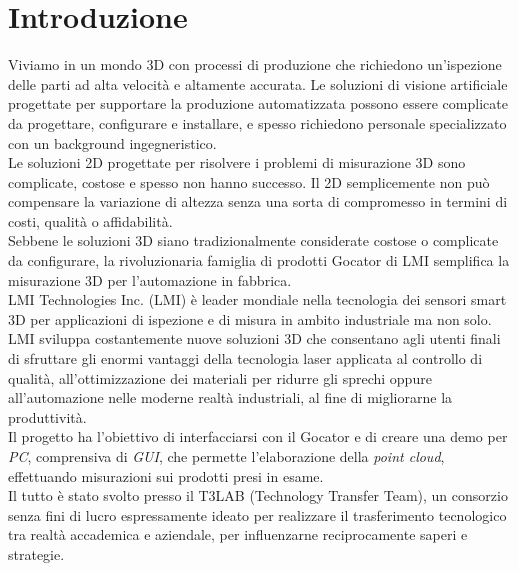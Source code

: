 \chapter{Introduzione}
\label{Cha:introduzione}
\thispagestyle{empty}

Viviamo in un mondo 3D con processi di produzione che richiedono un'ispezione delle parti ad alta velocità e altamente accurata. Le soluzioni di visione artificiale progettate per supportare la produzione automatizzata possono essere complicate da progettare, configurare e installare, e spesso richiedono personale specializzato con un background ingegneristico.\\
\newline
Le soluzioni 2D progettate per risolvere i problemi di misurazione 3D sono complicate, costose e spesso non hanno successo. Il 2D semplicemente non può compensare la variazione di altezza senza una sorta di compromesso in termini di costi, qualità o affidabilità.\\
\newline
Sebbene le soluzioni 3D siano tradizionalmente considerate costose o complicate da configurare, la rivoluzionaria famiglia di prodotti Gocator di LMI semplifica la misurazione 3D per l'automazione in fabbrica.\\
\newline
LMI Technologies Inc. (LMI) è leader mondiale nella tecnologia dei sensori smart 3D per applicazioni di ispezione e di misura in ambito industriale ma non solo. LMI sviluppa costantemente nuove soluzioni 3D che consentano agli utenti finali di sfruttare gli enormi vantaggi della tecnologia laser applicata al controllo di qualità, all'ottimizzazione dei materiali per ridurre gli sprechi oppure all'automazione nelle moderne realtà industriali, al fine di migliorarne la produttività.\\
\newline
Il progetto ha l'obiettivo di interfacciarsi con il Gocator e di creare una demo per \textit{PC}, comprensiva di \textit{GUI}, che permette l'elaborazione della \textit{point cloud}, effettuando misurazioni sui prodotti presi in esame.\\
\newline
Il tutto è stato svolto presso il T3LAB (Technology Transfer Team), un consorzio senza fini di lucro espressamente ideato per realizzare il trasferimento tecnologico tra realtà accademica e aziendale, per influenzarne reciprocamente saperi e strategie.\\

